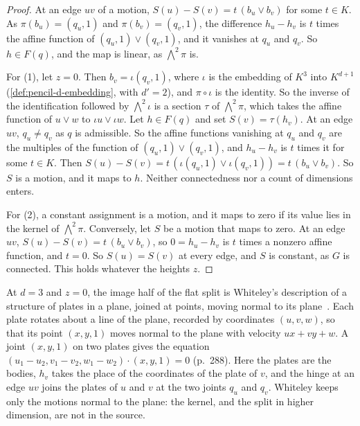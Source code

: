 \begin{proof}
  \leanok
  At an edge $uv$ of a motion, $S(u) - S(v) = t\,(b_u \vee b_v)$ for some
  $t \in K$. As $\pi(b_u) = (q_u, 1)$ and $\pi(b_v) = (q_v, 1)$, the
  difference $h_u - h_v$ is $t$ times the affine function of
  $(q_u, 1) \vee (q_v, 1)$, and it vanishes at $q_u$ and $q_v$. So
  $h \in F(q)$, and the map is linear, as $\bigwedge^2 \pi$ is.

  For (1), let $z = 0$. Then $b_v = \iota(q_v, 1)$, where $\iota$ is the
  embedding of $K^3$ into $K^{d+1}$ (\cref{def:pencil-d-embedding}, with
  $d' = 2$), and $\pi \circ \iota$ is the identity. So the inverse of the
  identification followed by $\bigwedge^2 \iota$ is a section $\tau$ of
  $\bigwedge^2 \pi$, which takes the affine function of $u \vee w$ to
  $\iota u \vee \iota w$. Let $h \in F(q)$ and set $S(v) = \tau(h_v)$.
  At an edge $uv$, $q_u \neq q_v$ as $q$ is admissible. So the affine
  functions vanishing at $q_u$ and $q_v$ are the multiples of the function
  of $(q_u, 1) \vee (q_v, 1)$, and $h_u - h_v$ is $t$ times it for some
  $t \in K$. Then
  $S(u) - S(v) = t\,(\iota(q_u, 1) \vee \iota(q_v, 1)) = t\,(b_u \vee b_v)$.
  So $S$ is a motion, and it maps to $h$. Neither connectedness nor a
  count of dimensions enters.

  For (2), a constant assignment is a motion, and it maps to zero if its
  value lies in the kernel of $\bigwedge^2 \pi$. Conversely, let $S$ be a
  motion that maps to zero. At an edge $uv$,
  $S(u) - S(v) = t\,(b_u \vee b_v)$, so $0 = h_u - h_v$ is $t$ times a
  nonzero affine function, and $t = 0$. So $S(u) = S(v)$ at every edge,
  and $S$ is constant, as $G$ is connected. This holds whatever the
  heights $z$.
\end{proof}

At $d = 3$ and $z = 0$, the image half of the flat split is Whiteley's
description of a structure of plates in a plane, joined at points, moving
normal to its plane~\cite[\S 5.1]{whiteley1984}. Each plate rotates about
a line of the plane, recorded by coordinates $(u, v, w)$, so that its
point $(x, y, 1)$ moves normal to the plane with velocity $ux + vy + w$.
A joint $(x, y, 1)$ on two plates gives the equation
$(u_1 - u_2, v_1 - v_2, w_1 - w_2) \cdot (x, y, 1) = 0$ (p.~288). Here the
plates are the bodies, $h_v$ takes the place of the coordinates of the
plate of $v$, and the hinge at an edge $uv$ joins the plates of $u$ and
$v$ at the two joints $q_u$ and $q_v$. Whiteley keeps only the motions
normal to the plane: the kernel, and the split in higher dimension, are
not in the source.


